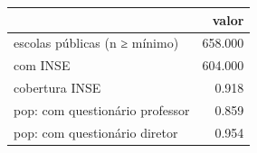 \begin{tabular}{lr}
\toprule
 & valor \\
\midrule
escolas públicas (n ≥ mínimo) & 658.000 \\
com INSE & 604.000 \\
cobertura INSE & 0.918 \\
pop: com questionário professor & 0.859 \\
pop: com questionário diretor & 0.954 \\
\bottomrule
\end{tabular}
